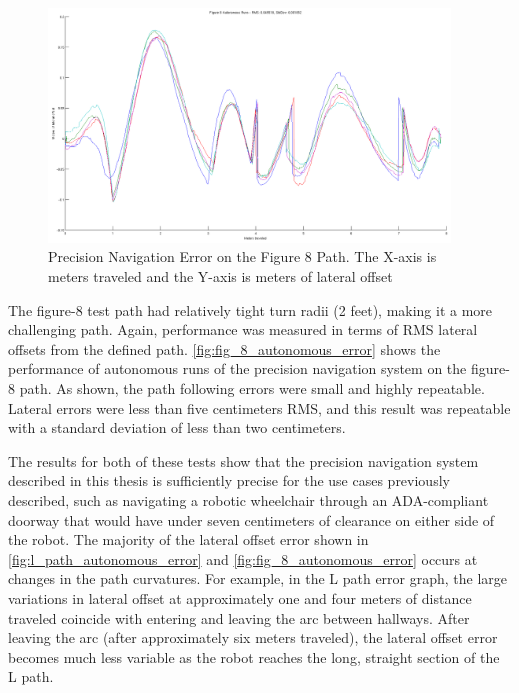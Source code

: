 \begin{figure}
\centering
\includegraphics[width=0.95\textwidth]{images/fig_8_autonomous_error}
\caption[Precision Navigation Error on the Figure 8 Path]{Precision Navigation Error on the Figure 8 Path. The X-axis is meters traveled and the Y-axis is meters of lateral offset}
\label{fig:fig_8_autonomous_error}
\end{figure}

The figure-8 test path had relatively tight turn radii (2 feet), making it a more challenging path. Again, performance was measured in terms of RMS lateral offsets from the defined path. \autoref{fig:fig_8_autonomous_error} shows the performance of autonomous runs of the precision navigation system on the figure-8 path. As shown, the path following errors were small and highly repeatable. Lateral errors were less than five centimeters RMS, and this result was repeatable with a standard deviation of less than two centimeters.

The results for both of these tests show that the precision navigation system described in this thesis is sufficiently precise for the use cases previously described, such as navigating a robotic wheelchair through an ADA-compliant doorway that would have under seven centimeters of clearance on either side of the robot. The majority of the lateral offset error shown in \autoref{fig:l_path_autonomous_error} and \autoref{fig:fig_8_autonomous_error} occurs at changes in the path curvatures. For example, in the L path error graph, the large variations in lateral offset at approximately one and four meters of distance traveled coincide with entering and leaving the arc between hallways. After leaving the arc (after approximately six meters traveled), the lateral offset error becomes much less variable as the robot reaches the long, straight section of the L path.

